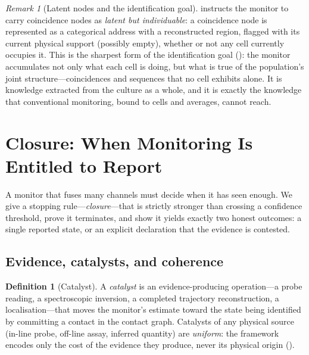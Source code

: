 \documentclass[11pt,twocolumn,a4paper]{article}
\theoremstyle{thmstyle}
\theoremstyle{definition}
\newtheorem{definition}[theorem]{Definition}
\theoremstyle{remark}
\newtheorem{remark}[theorem]{Remark}
\begin{document}
\begin{remark}[Latent nodes and the identification goal]
\label{rem:latent}
 instructs the monitor to carry coincidence nodes as
\emph{latent but individuable}: a coincidence node is represented as a
categorical address with a reconstructed region, flagged with its current
physical support (possibly empty), whether or not any cell currently
occupies it. This is the sharpest form of the identification goal
(): the monitor accumulates not only what each cell is
doing, but what is true of the population's joint structure---coincidences
and sequences that no cell exhibits alone. It is knowledge extracted from
the culture as a whole, and it is exactly the knowledge that conventional
monitoring, bound to cells and averages, cannot reach.
\end{remark}


\section{Closure: When Monitoring Is Entitled to Report}
\label{sec:closure}

A monitor that fuses many channels must decide when it has seen enough. We
give a stopping rule---\emph{closure}---that is strictly stronger than
crossing a confidence threshold, prove it terminates, and show it yields
exactly two honest outcomes: a single reported state, or an explicit
declaration that the evidence is contested.

\subsection{Evidence, catalysts, and coherence}

\begin{definition}[Catalyst]
\label{def:catalyst}
A \emph{catalyst} is an evidence-producing operation---a probe reading, a
spectroscopic inversion, a completed trajectory reconstruction, a
localisation---that moves the monitor's estimate toward the state being
identified by committing a contact in the contact graph. Catalysts of any
physical source (in-line probe, off-line assay, inferred quantity) are
\emph{uniform}: the framework encodes only the cost of the evidence they
produce, never its physical origin ().
\end{definition}
\end{document}
